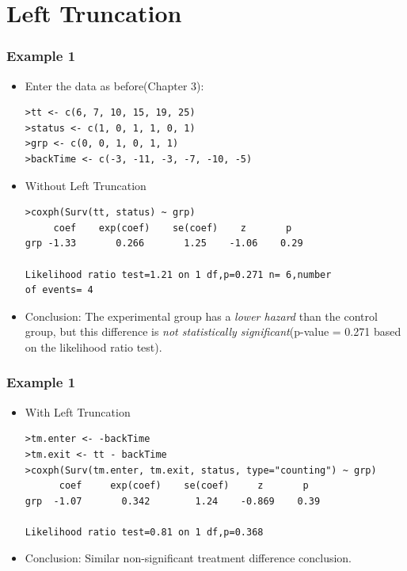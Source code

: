 \documentclass{beamer}
\newcommand{\empr}[1]{{\emph{\color{red}#1}}}
\begin{document}
\section{Left Truncation}
\begin{frame}[fragile]
\frametitle{Example 1}
\begin{itemize}
\item Enter the data as before(Chapter 3):
\begin{Verbatim}
>tt <- c(6, 7, 10, 15, 19, 25)
>status <- c(1, 0, 1, 1, 0, 1)
>grp <- c(0, 0, 1, 0, 1, 1)
>backTime <- c(-3, -11, -3, -7, -10, -5)
\end{Verbatim}
\item Without {\color{red}Left Truncation}
\begin{Verbatim}
>coxph(Surv(tt, status) ~ grp)
     coef    exp(coef)    se(coef)    z       p 
grp -1.33       0.266       1.25    -1.06    0.29

Likelihood ratio test=1.21 on 1 df,p=0.271 n= 6,number 
of events= 4
\end{Verbatim}
\item Conclusion: The experimental group has a \empr{lower hazard} than the control group, but this difference is \empr{not statistically significant}(p-value = 0.271 based on the likelihood ratio test).
\end{itemize}
\end{frame}

\pagebreak
\begin{frame}[fragile]
\frametitle{Example 1}
\begin{itemize}
\item With {\color{red}Left Truncation}
\begin{Verbatim}
>tm.enter <- -backTime 
>tm.exit <- tt - backTime
>coxph(Surv(tm.enter, tm.exit, status, type="counting") ~ grp)
      coef     exp(coef)    se(coef)     z       p 
grp  -1.07       0.342        1.24    -0.869    0.39
	
Likelihood ratio test=0.81 on 1 df,p=0.368
\end{Verbatim}
\item Conclusion: Similar non-significant treatment difference conclusion.
\end{itemize}
\end{frame}
\end{document}
